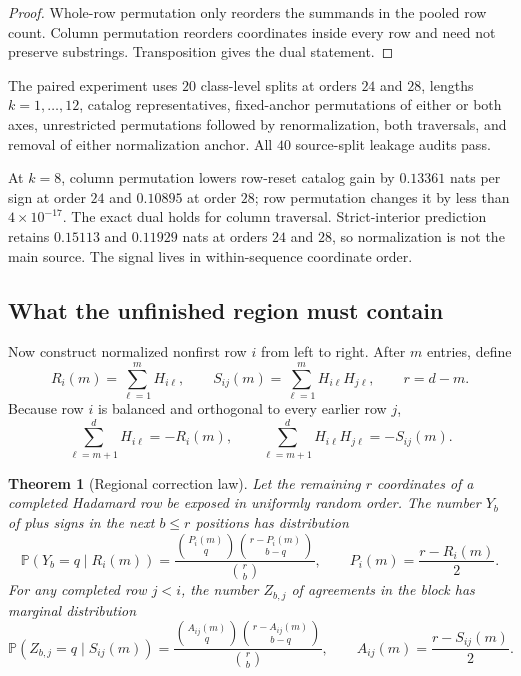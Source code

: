 \documentclass[10pt,twoside]{article}
\theoremstyle{noteplain}
\newtheorem{theorem}{Theorem}
\theoremstyle{definition}
\newcommand{\Prb}{\mathbb{P}}
\begin{document}
\begin{proof}
Whole-row permutation only reorders the summands in the pooled row count.  Column permutation reorders coordinates inside every row and need not preserve substrings.  Transposition gives the dual statement.
\end{proof}

The paired experiment uses $20$ class-level splits at orders $24$ and $28$, lengths $k=1,\ldots,12$, catalog representatives, fixed-anchor permutations of either or both axes, unrestricted permutations followed by renormalization, both traversals, and removal of either normalization anchor.  All $40$ source-split leakage audits pass.

At $k=8$, column permutation lowers row-reset catalog gain by $0.13361$ nats per sign at order $24$ and $0.10895$ at order $28$; row permutation changes it by less than $4\times10^{-17}$.  The exact dual holds for column traversal.  Strict-interior prediction retains $0.15113$ and $0.11929$ nats at orders $24$ and $28$, so normalization is not the main source.  The signal lives in within-sequence coordinate order.

\subsection{What the unfinished region must contain}

Now construct normalized nonfirst row $i$ from left to right.  After $m$ entries, define
\begin{equation}\label{eq:state}
R_i(m)=\sum_{\ell=1}^{m}H_{i\ell},
\qquad
S_{ij}(m)=\sum_{\ell=1}^{m}H_{i\ell}H_{j\ell},
\qquad
r=d-m.
\end{equation}
Because row $i$ is balanced and orthogonal to every earlier row $j$,
\begin{equation}\label{eq:debts}
\sum_{\ell=m+1}^{d}H_{i\ell}=-R_i(m),
\qquad
\sum_{\ell=m+1}^{d}H_{i\ell}H_{j\ell}=-S_{ij}(m).
\end{equation}

\begin{theorem}[Regional correction law]\label{thm:regional}
Let the remaining $r$ coordinates of a completed Hadamard row be exposed in uniformly random order.  The number $Y_b$ of plus signs in the next $b\le r$ positions has distribution
\begin{equation}\label{eq:row-hyper}
\Prb(Y_b=q\mid R_i(m))
=\frac{\binom{P_i(m)}q\binom{r-P_i(m)}{b-q}}{\binom rb},
\qquad
P_i(m)=\frac{r-R_i(m)}2.
\end{equation}
For any completed row $j<i$, the number $Z_{b,j}$ of agreements in the block has marginal distribution
\begin{equation}\label{eq:pair-hyper}
\Prb(Z_{b,j}=q\mid S_{ij}(m))
=\frac{\binom{A_{ij}(m)}q\binom{r-A_{ij}(m)}{b-q}}{\binom rb},
\qquad
A_{ij}(m)=\frac{r-S_{ij}(m)}2.
\end{equation}
\end{theorem}
\end{document}
